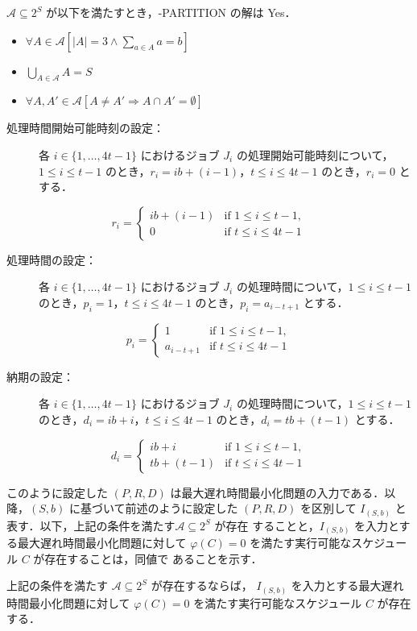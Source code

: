 \documentclass[12pt]{optlab-bachelor}
\begin{document}
$\mathcal{A} \subseteq 2^{S}$ が以下を満たすとき，{-PARTITION} の解は Yes．
\begin{itemize}
  \item $\forall A \in \mathcal{A}[|A| = 3 \land \sum_{a \in A} a = b]$
  \item $\bigcup_{A \in \mathcal{A}} A = S$
  \item $\forall A, A' \in \mathcal{A}[A \neq A' \Rightarrow A \cap A' = \emptyset]$
\end{itemize}

\begin{description}
  \item[処理時間開始可能時刻の設定：] 各 $i \in \{1,\ldots,4t - 1\}$ におけるジョブ $J_i$ の処理開始可能時刻について，$1 \le i \le t - 1$ のとき，$r_i = ib + (i - 1)$，$t \le i \le 4t - 1$ のとき，$r_{i} = 0$ とする．
\end{description}
$$r_i = \left\{ \begin{array}{ll} ib + (i - 1) & \text{if } 1 \le i \le t - 1, \\ 0 & \text{if } t \le i \le 4t - 1\end{array} \right.$$
\begin{description}
  \item[処理時間の設定：] 各 $i \in \{1,\ldots,4t - 1\}$ におけるジョブ $J_i$ の処理時間について，$1 \le i \le t - 1$ のとき，$p_i = 1$，$t \le i \le 4t - 1$ のとき，$p_{i} = a_{i - t + 1}$ とする．
\end{description}
$$p_i = \left\{ \begin{array}{ll} 1 & \text{if } 1 \le i \le t - 1, \\ a_{i - t + 1} & \text{if } t \le i \le 4t - 1\end{array} \right.$$
\begin{description}
  \item[納期の設定：] 各 $i \in \{1,\ldots,4t - 1\}$ におけるジョブ $J_i$ の処理時間について，$1 \le i \le t - 1$ のとき，$d_i = ib + i$，$t \le i \le 4t - 1$ のとき，$d_i = tb + (t - 1)$ とする．
\end{description}
$$d_i = \left\{ \begin{array}{ll} ib + i & \text{if } 1 \le i \le t - 1, \\ tb + (t - 1) & \text{if } t \le i \le 4t - 1\end{array} \right.$$

このように設定した $(P,R,D)$ は最大遅れ時間最小化問題の入力である．以
降，$(S,b)$ に基づいて前述のように設定した $(P,R,D)$ を区別して
$I_{(S,b)}$ と表す．以下，上記の条件を満たす$\mathcal{A} \subseteq 2^S$ が存在
することと，$I_{(S,b)}$ を入力とする最大遅れ時間最小化問題に対して
$\varphi(C) =  0$
を満たす実行可能なスケジュール $C$ が存在することは，同値で
あることを示す．
\begin{lemma}\label{l_3}
  上記の条件を満たす $\mathcal{A} \subseteq 2^S$ が存在するならば，
  $I_{(S,b)}$ を入力とする最大遅れ時間最小化問題に対して $\varphi(C) =
  0$ を満たす実行可能なスケジュール $C$ が存在する．
\end{lemma}
\end{document}
